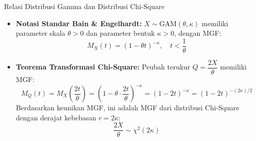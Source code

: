\documentclass[10pt,twoside]{article}
\begin{document}
\begin{tipbox}{Relasi Distribusi Gamma dan Distribusi Chi-Square}
\begin{itemize}
  \item \textbf{Notasi Standar Bain \& Engelhardt:} $X \sim \text{GAM}(\theta, \kappa)$ memiliki parameter skala $\theta > 0$ dan parameter bentuk $\kappa > 0$, dengan MGF:
  \[
  M_X(t) = (1 - \theta t)^{-\kappa}, \quad t < \frac{1}{\theta}
  \]
  \item \textbf{Teorema Transformasi Chi-Square:} Peubah terukur $Q = \dfrac{2X}{\theta}$ memiliki MGF:
  \[
  M_Q(t) = M_X\left(\frac{2t}{\theta}\right) = \left(1 - \theta \cdot \frac{2t}{\theta}\right)^{-\kappa} = (1 - 2t)^{-\kappa} = (1 - 2t)^{-(2\kappa)/2}
  \]
  Berdasarkan keunikan MGF, ini adalah MGF dari distribusi Chi-Square dengan derajat kebebasan $r = 2\kappa$:
  \[
  \frac{2X}{\theta} \sim \chi^2(2\kappa)
  \]
\end{itemize}
\end{tipbox}
\end{document}
